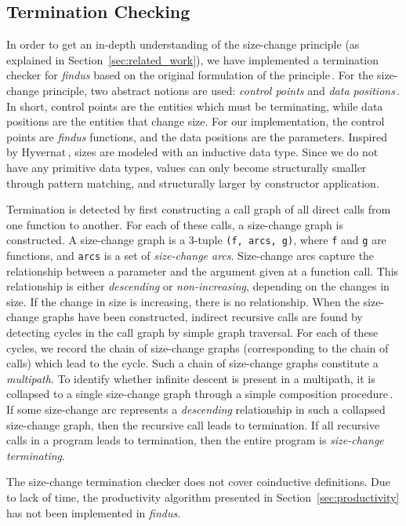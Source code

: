 \subsection{Termination Checking}
In order to get an in-depth understanding of the size-change principle (as explained in Section~\ref{sec:related_work}), we have implemented a termination checker for \textit{findus} based on the original formulation of the principle\,\citep{LeeJones01SizeChange}. For the size-change principle, two abstract notions are used: \emph{control points} and \emph{data positions}\,\citep{Krauss07certifiedsizechange}. In short, control points are the entities which must be terminating, while data positions are the entities that change size. For our implementation, the control points are \textit{findus} functions, and the data positions are the parameters. Inspired by Hyvernat\,\citep{Hyvernat13}, sizes are modeled with an inductive data type. Since we do not have any primitive data types, values can only become structurally smaller through pattern matching, and structurally larger by constructor application.

Termination is detected by first constructing a call graph of all direct calls from one function to another. For each of these calls, a size-change graph is constructed. A size-change graph is a 3-tuple \texttt{(f, arcs, g)}, where \texttt{f} and \texttt{g} are functions, and \texttt{arcs} is a set of \emph{size-change arcs}. Size-change arcs capture the relationship between a parameter and the argument given at a function call. This relationship is either \emph{descending} or \emph{non-increasing}, depending on the changes in size. If the change in size is increasing, there is no relationship. When the size-change graphs have been constructed, indirect recursive calls are found by detecting cycles in the call graph by simple graph traversal. For each of these cycles, we record the chain of size-change graphs (corresponding to the chain of calls) which lead to the cycle. Such a chain of size-change graphs constitute a \emph{multipath}. To identify whether infinite descent is present in a multipath, it is collapsed to a single size-change graph through a simple composition procedure\,\citep{LeeJones01SizeChange}. If some size-change arc represents a \emph{descending} relationship in such a collapsed size-change graph, then the recursive call leads to termination. If all recursive calls in a program leads to termination, then the entire program is \emph{size-change terminating}.

The size-change termination checker does not cover coinductive definitions. Due to lack of time, the productivity algorithm presented in Section~\ref{sec:productivity} has not been implemented in \textit{findus}.

